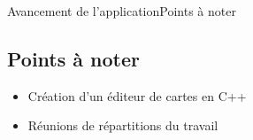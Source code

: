 \begin{frame}{Avancement de l'application}{Points à noter}
\subsection{Points à noter}
\begin{itemize}
	\item Création d'un éditeur de cartes en C++
	\item Réunions de répartitions du travail
\end{itemize}
\end{frame}
